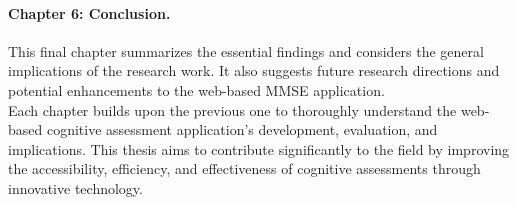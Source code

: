 \paragraph{Chapter 6: Conclusion.} This final chapter summarizes the essential findings and considers the general implications of the research work. It also suggests future research directions and potential enhancements to the web-based MMSE application.\\

Each chapter builds upon the previous one to thoroughly understand the web-based cognitive assessment application's development, evaluation, and implications. This thesis aims to contribute significantly to the field by improving the accessibility, efficiency, and effectiveness of cognitive assessments through innovative technology.